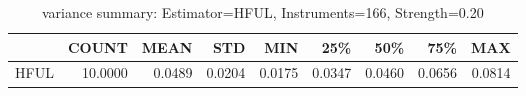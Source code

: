 \begin{table}[ht]
\centering
\caption{variance summary: Estimator=HFUL, Instruments=166, Strength=0.20}
\begin{tabular}{lrrrrrrrr}
\toprule
 & COUNT & MEAN & STD & MIN & 25\% & 50\% & 75\% & MAX \\
\midrule
HFUL & 10.0000 & 0.0489 & 0.0204 & 0.0175 & 0.0347 & 0.0460 & 0.0656 & 0.0814 \\
\bottomrule
\end{tabular}
\end{table}
